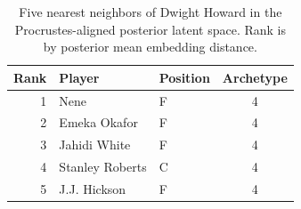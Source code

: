 \begin{table}[htbp]
  \centering\small
  \begin{tabular}{rllc}
    \toprule
    Rank & Player & Position & Archetype \\
    \midrule
    1 & Nene & F & 4 \\
    2 & Emeka Okafor & F & 4 \\
    3 & Jahidi White & F & 4 \\
    4 & Stanley Roberts & C & 4 \\
    5 & J.J. Hickson & F & 4 \\
    \bottomrule
  \end{tabular}
  \caption{Five nearest neighbors of Dwight Howard in the Procrustes-aligned posterior latent space. Rank is by posterior mean embedding distance.}
  \label{tab:Dwight_Howard_neighbors}
\end{table}


